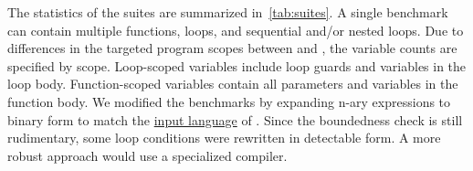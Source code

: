 The statistics of the suites are summarized in~\autoref{tab:suites}.
A single benchmark can contain multiple functions, loops, and sequential and/or nested loops.
Due to differences in the targeted program scopes between \impl and \impf, the variable counts are specified by scope.
Loop-scoped variables include loop guards and variables in the loop body.
Function-scoped variables contain all parameters and variables in the function body.
We modified the benchmarks by expanding n-ary expressions to binary form to match the \href{https://statycc.github.io/pymwp/features/}{input language} of .
Since the boundedness check is still rudimentary, some loop conditions were rewritten in detectable form.
A more robust approach would use a specialized compiler.
